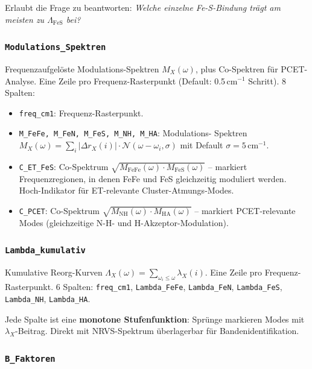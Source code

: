 \documentclass[11pt,a4paper,twoside]{article}
\theoremstyle{remark}
\begin{document}
Erlaubt die Frage zu beantworten: \emph{Welche einzelne Fe-S-Bindung
tr\"agt am meisten zu $\Lambda_\text{FeS}$ bei?}

\subsubsection*{\texttt{Modulations\_Spektren}}

Frequenzaufgel\"oste Modulations-Spektren $M_X(\omega)$, plus
Co-Spektren f\"ur PCET-Analyse. Eine Zeile pro Frequenz-Rasterpunkt
(Default: 0.5\,cm$^{-1}$ Schritt). 8 Spalten:

\begin{itemize}\setlength{\itemsep}{0pt}
  \item \texttt{freq\_cm1}: Frequenz-Rasterpunkt.
  \item \texttt{M\_FeFe, M\_FeN, M\_FeS, M\_NH, M\_HA}: Modulations-
        Spektren $M_X(\omega) = \sum_i |\Delta r_X(i)| \cdot
        \mathcal{N}(\omega - \omega_i, \sigma)$ mit Default
        $\sigma=5$\,cm$^{-1}$.
  \item \texttt{C\_ET\_FeS}: Co-Spektrum
        $\sqrt{M_\text{FeFe}(\omega) \cdot M_\text{FeS}(\omega)}$
        -- markiert Frequenzregionen, in denen FeFe und FeS
        gleichzeitig moduliert werden. Hoch-Indikator f\"ur
        ET-relevante Cluster-Atmungs-Modes.
  \item \texttt{C\_PCET}: Co-Spektrum
        $\sqrt{M_\text{NH}(\omega) \cdot M_\text{HA}(\omega)}$
        -- markiert PCET-relevante Modes (gleichzeitige
        N-H- und H-Akzeptor-Modulation).
\end{itemize}

\subsubsection*{\texttt{Lambda\_kumulativ}}

Kumulative Reorg-Kurven $\Lambda_X(\omega) = \sum_{\omega_i \leq \omega}
\lambda_X(i)$. Eine Zeile pro Frequenz-Rasterpunkt. 6 Spalten:
\texttt{freq\_cm1}, \texttt{Lambda\_FeFe}, \texttt{Lambda\_FeN},
\texttt{Lambda\_FeS}, \texttt{Lambda\_NH}, \texttt{Lambda\_HA}.

Jede Spalte ist eine \textbf{monotone Stufenfunktion}: Spr\"unge
markieren Modes mit $\lambda_X$-Beitrag. Direkt mit NRVS-Spektrum
\"uberlagerbar f\"ur Bandenidentifikation.

\subsubsection*{\texttt{B\_Faktoren}}
\end{document}
